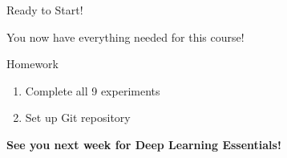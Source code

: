 \documentclass[aspectratio=169,10pt]{beamer}
\begin{document}
\begin{frame}{Ready to Start!}
\begin{center}
\Large{You now have everything needed for this course!}
\end{center}

\begin{block}{Homework}
\begin{enumerate}
    \item Complete all 9 experiments
    \item Set up Git repository
\end{enumerate}
\end{block}

\begin{center}
\textbf{See you next week for Deep Learning Essentials!}
\end{center}
\end{frame}
\end{document}
